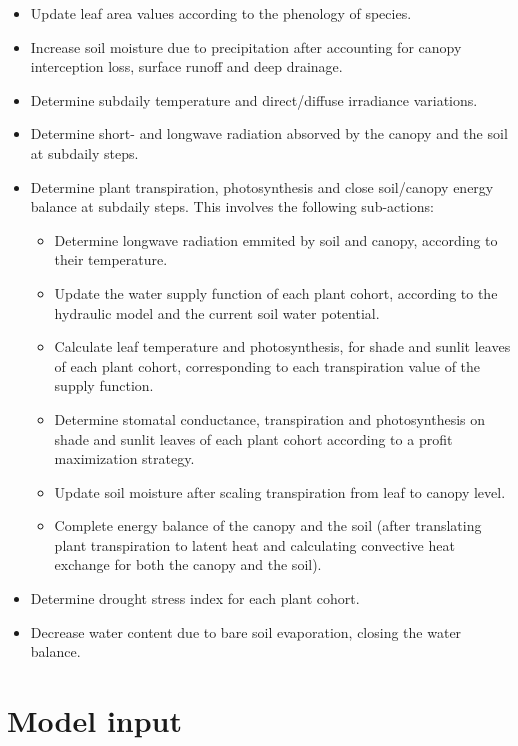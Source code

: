 \documentclass[]{book}
\providecommand{\tightlist}{%
  \setlength{\itemsep}{0pt}\setlength{\parskip}{0pt}}
\begin{document}
\begin{itemize}
\tightlist
\item
  Update leaf area values according to the phenology of species.
\item
  Increase soil moisture due to precipitation after accounting for
  canopy interception loss, surface runoff and deep drainage.
\item
  Determine subdaily temperature and direct/diffuse irradiance
  variations.
\item
  Determine short- and longwave radiation absorved by the canopy and the
  soil at subdaily steps.
\item
  Determine plant transpiration, photosynthesis and close soil/canopy
  energy balance at subdaily steps. This involves the following
  sub-actions:

  \begin{itemize}
  \tightlist
  \item
    Determine longwave radiation emmited by soil and canopy, according
    to their temperature.
  \item
    Update the water supply function of each plant cohort, according to
    the hydraulic model and the current soil water potential.
  \item
    Calculate leaf temperature and photosynthesis, for shade and sunlit
    leaves of each plant cohort, corresponding to each transpiration
    value of the supply function.
  \item
    Determine stomatal conductance, transpiration and photosynthesis on
    shade and sunlit leaves of each plant cohort according to a profit
    maximization strategy.
  \item
    Update soil moisture after scaling transpiration from leaf to canopy
    level.
  \item
    Complete energy balance of the canopy and the soil (after
    translating plant transpiration to latent heat and calculating
    convective heat exchange for both the canopy and the soil).
  \end{itemize}
\item
  Determine drought stress index for each plant cohort.
\item
  Decrease water content due to bare soil evaporation, closing the water
  balance.
\end{itemize}

\section{Model input}\label{model-input-1}
\end{document}
